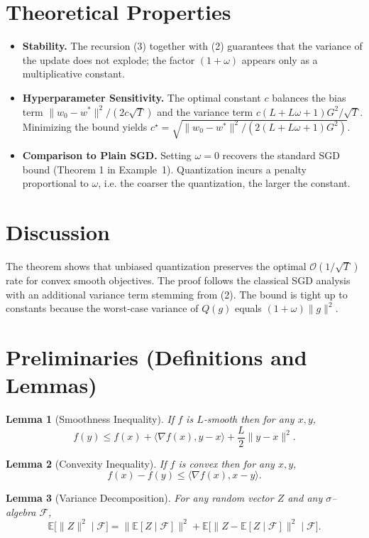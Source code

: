 \documentclass{article}
\newtheorem{lemma}{Lemma}
\begin{document}
\section*{Theoretical Properties}
\begin{itemize}
\item \textbf{Stability.} The recursion (3) together with (2) guarantees that the variance of the update does not explode; the factor $(1+\omega)$ appears only as a multiplicative constant.
\item \textbf{Hyperparameter Sensitivity.} The optimal constant $c$ balances the bias term $\|w_0-w^*\|^2/(2c\sqrt{T})$ and the variance term $c(L+L\omega+1)G^2/\sqrt{T}$. Minimizing the bound yields $c^\star=\sqrt{\|w_0-w^*\|^2/(2(L+L\omega+1)G^2)}$.
\item \textbf{Comparison to Plain SGD.} Setting $\omega=0$ recovers the standard SGD bound (Theorem 1 in Example 1). Quantization incurs a penalty proportional to $\omega$, i.e. the coarser the quantization, the larger the constant.
\end{itemize}

\section*{Discussion}
The theorem shows that unbiased quantization preserves the optimal $\mathcal{O}(1/\sqrt{T})$ rate for convex smooth objectives. The proof follows the classical SGD analysis with an additional variance term stemming from (2). The bound is tight up to constants because the worst‑case variance of $Q(g)$ equals $(1+\omega)\|g\|^2$.

\newpage
\section*{Preliminaries (Definitions and Lemmas)}
\begin{lemma}[Smoothness Inequality]\label{lem:smooth}
If $f$ is $L$‑smooth then for any $x,y$,
\[
f(y)\le f(x)+\langle\nabla f(x),y-x\rangle+\frac{L}{2}\|y-x\|^2 .
\]
\end{lemma}
\begin{lemma}[Convexity Inequality]\label{lem:convex}
If $f$ is convex then for any $x,y$,
\[
f(x)-f(y)\le\langle\nabla f(x),x-y\rangle .
\]
\end{lemma}
\begin{lemma}[Variance Decomposition]\label{lem:var}
For any random vector $Z$ and any $\sigma$–algebra $\mathcal{F}$,
\[
\mathbb{E}\bigl[\|Z\|^2\mid\mathcal{F}\bigr]
= \|\mathbb{E}[Z\mid\mathcal{F}]\|^2
+ \mathbb{E}\bigl[\|Z-\mathbb{E}[Z\mid\mathcal{F}]\|^2\mid\mathcal{F}\bigr].
\]
\end{lemma}
\end{document}
